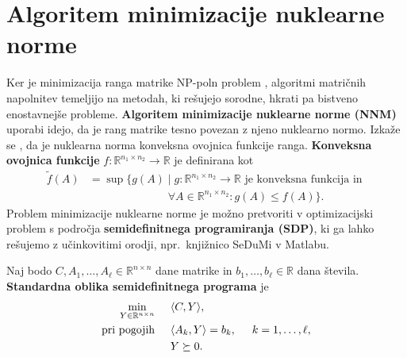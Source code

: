\section{Algoritem minimizacije nuklearne norme} \label{1707-1755}
Ker je minimizacija ranga matrike NP-poln problem \cite{NNM-PHD}, algoritmi matričnih napolnitev temeljijo na metodah, ki rešujejo sorodne, hkrati pa bistveno enostavnejše probleme. \textbf{Algoritem minimizacije nuklearne norme (NNM)} uporabi idejo, da je rang matrike tesno povezan z njeno nuklearno normo.
Izkaže se \cite{NNM-PHD}, da je nuklearna norma konveksna ovojnica funkcije ranga. \textbf{Konveksna ovojnica funkcije} $f : \mathbb{R}^{n_1 \times n_2} \rightarrow \mathbb{R}$ je definirana kot 
\begin{align*}
    \tilde{f}(A) 
    &= \sup\{g(A) \mid g:\mathbb R^{n_1\times n_2}\to \mathbb R \text{ je konveksna funkcija in }\\ 
    &\hspace{3cm}\forall A\in \mathbb R^{n_1\times n_2}: g(A) \leq f(A) \}.
\end{align*}
Problem minimizacije nuklearne norme je možno pretvoriti v optimizacijski problem s področja \textbf{semidefinitnega programiranja (SDP)}, ki ga lahko rešujemo z učinkovitimi orodji, npr.\ knjižnico SeDuMi \cite{SeDuMi} v Matlabu.

Naj bodo $C,A_1,\ldots,A_\ell \in \mathbb{R}^{n \times n}$ dane matrike in $b_1,\ldots,b_\ell\in \mathbb R$ dana števila.
\textbf{Standardna oblika semidefinitnega programa} je
\begin{align}
\label{1007-1829} 
\begin{split}
    \min_{Y\in \mathbb R^{n\times n}} \hspace{0.5cm}             & \langle C, Y \rangle,                                                                         \\
    \text{pri pogojih} \hspace{0.5cm} & \langle A_k, Y \rangle = b_k, \hspace{0.5cm} k = 1, \hdots , \ell,\\
                                      & Y \succeq 0.
\end{split}
\end{align}

